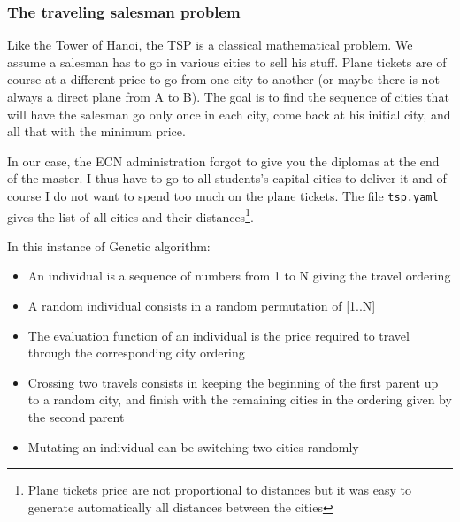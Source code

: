 \documentclass{ecnreport}
\begin{document}
\subsubsection{The traveling salesman problem}

Like the Tower of Hanoi, the TSP is a classical mathematical problem. We assume a salesman has to go in various cities to sell his stuff. Plane tickets are of course at a different price to go from one city to another (or maybe there is not always a direct plane from A to B). The goal is to find the sequence of cities that will have the salesman go only once in each city, come back at his initial city, and all that with the minimum price.

In our case, the ECN administration forgot to give you the diplomas at the end of the master. I thus have to go to all students's capital cities to deliver it and of course I do not want to spend too much on the plane tickets. The file \texttt{tsp.yaml} gives the list of all cities and their distances\footnote{Plane tickets price are not proportional to distances but it was easy to generate automatically all distances between the cities}.

In this instance of Genetic algorithm:
\begin{itemize}
\item An individual is a sequence of numbers from 1 to N giving the travel ordering
\item A random individual consists in a random permutation of [1..N]
\item The evaluation function of an individual is the price required to travel through the corresponding city ordering
\item Crossing two travels consists in keeping the beginning of the first parent up to a random city, and finish with the remaining cities in the ordering given by the second parent
\item Mutating an individual can be switching two cities randomly
\end{itemize}

 \begin{itemize}
 \end{itemize}
\end{document}

